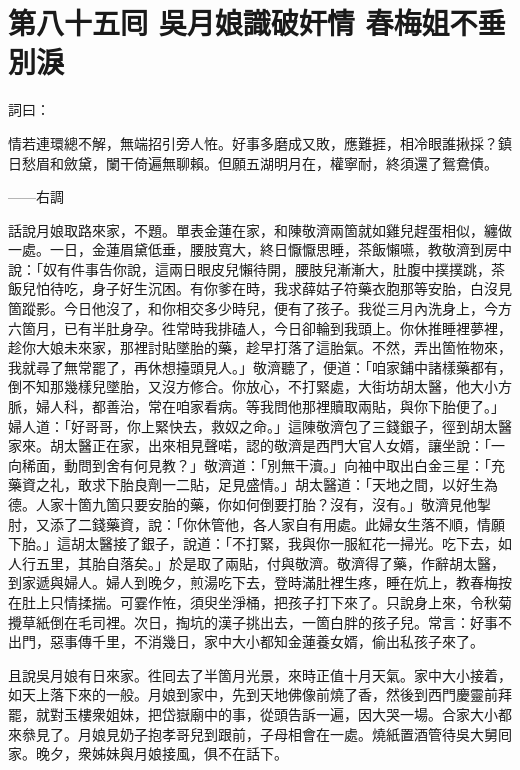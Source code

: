 
\chapter*{第八十五囘 吳月娘識破奸情 春梅姐不垂別淚}


詞曰：

情若連環總不解，無端招引旁人恠。好事多磨成又敗，應難捱，相冷眼誰揪採？鎮日愁眉和斂黛，闌干倚遍無聊賴。但願五湖明月在，權寧耐，終須還了鴛鴦債。

——右調

話說月娘取路來家，不題。單表金蓮在家，和陳敬濟兩箇就如雞兒趕蛋相似，纏做一處。一日，金蓮眉黛低垂，腰肢寬大，終日懨懨思睡，茶飯懶嚥，教敬濟到房中說：「奴有件事告你說，這兩日眼皮兒懶待開，腰肢兒漸漸大，肚腹中撲撲跳，茶飯兒怕待吃，身子好生沉困。有你爹在時，我求薛姑子符藥衣胞那等安胎，白沒見箇蹤影。今日他沒了，和你相交多少時兒，便有了孩子。{}我從三月內洗身上，今方六箇月，已有半肚身孕。徃常時我排磕人，今日卻輪到我頭上。你休推睡裡夢裡，趁你大娘未來家，那裡討貼墜胎的藥，趁早打落了這胎氣。不然，弄出箇恠物來，我就尋了無常罷了，再休想擡頭見人。」敬濟聽了，便道：「咱家鋪中諸樣藥都有，倒不知那幾樣兒墜胎，又沒方修合。你放心，不打緊處，大街坊胡太醫，他大小方脈，婦人科，都善治，常在咱家看病。等我問他那裡贖取兩貼，與你下胎便了。」婦人道：「好哥哥，你上緊快去，救奴之命。」這陳敬濟包了三錢銀子，徑到胡太醫家來。胡太醫正在家，出來相見聲喏，認的敬濟是西門大官人女婿，讓坐說：「一向稀面，動問到舍有何見教？」敬濟道：「別無干瀆。」向袖中取出白金三星：「充藥資之礼，敢求下胎良劑一二貼，足見盛情。」胡太醫道：「天地之間，以好生為德。人家十箇九箇只要安胎的藥，你如何倒要打胎？沒有，沒有。」敬濟見他掣肘，又添了二錢藥資，說：「你休管他，各人家自有用處。此婦女生落不順，情願下胎。」這胡太醫接了銀子，說道：「不打緊，我與你一服紅花一掃光。吃下去，如人行五里，其胎自落矣。」於是取了兩貼，付與敬濟。敬濟得了藥，作辭胡太醫，到家遞與婦人。婦人到晚夕，煎湯吃下去，登時滿肚裡生疼，睡在炕上，教春梅按在肚上只情揉揣。可霎作恠，須臾坐淨桶，把孩子打下來了。只說身上來，令秋菊攪草紙倒在毛司裡。次日，掏坑的漢子挑出去，一箇白胖的孩子兒。常言：好事不出門，惡事傳千里，不消幾日，家中大小都知金蓮養女婿，偷出私孩子來了。

且說吳月娘有日來家。徃囘去了半箇月光景，來時正值十月天氣。家中大小接着，如天上落下來的一般。{}月娘到家中，先到天地佛像前燒了香，然後到西門慶靈前拜罷，就對玉樓衆姐妹，把岱嶽廟中的事，從頭告訴一遍，因大哭一場。{}合家大小都來叅見了。月娘見奶子抱孝哥兒到跟前，子母相會在一處。燒紙置酒管待吳大舅囘家。晚夕，衆姊妹與月娘接風，俱不在話下。

